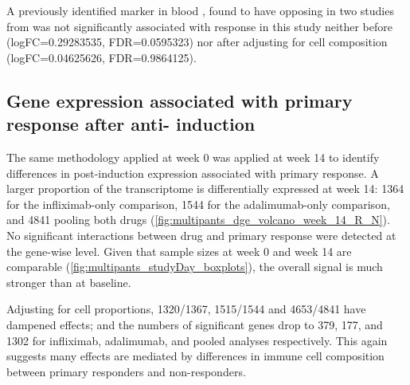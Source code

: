 \begin{outline}
A previously identified marker in blood , found to have opposing in two studies from \autocite{gaujoux2019CellcentredMetaanalysisReveals,verstockt2019LowTREM1Expression}
was not significantly associated with response in this study neither
before (logFC=\num{0.29283535}, FDR=\num{0.0595323})
nor after adjusting for cell composition (logFC=\num{0.04625626}, FDR=\num{0.9864125}).


\subsection{Gene expression associated with primary response after anti- induction}

The same methodology applied at week 0 was applied at week 14 to identify differences in post-induction expression associated with primary response.
A larger proportion of the transcriptome is differentially expressed at week 14: 
1364 for the infliximab-only comparison, 
1544 for the adalimumab-only comparison, 
and 4841 pooling both drugs (\autoref{fig:multipants_dge_volcano_week_14_R_N}).
No significant interactions between drug and primary response were detected at the gene-wise level.
Given that sample sizes at week 0 and week 14 are comparable (\autoref{fig:multipants_studyDay_boxplots}), the overall signal is much stronger than at baseline.

Adjusting for cell proportions, 1320/1367, 1515/1544 and 4653/4841 have dampened effects;
and the numbers of significant genes drop to 379, 177, and 1302 for infliximab, adalimumab, and pooled analyses respectively.
This again suggests many effects are mediated by differences in immune cell composition between primary responders and non-responders.


\end{outline}
